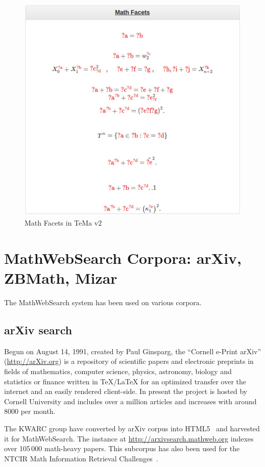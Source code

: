 \documentclass{deliverablereport}
\begin{document}
\begin{figure}[H]
\centering
 \includegraphics[scale=0.8]{figure10.jpg}
 \caption{Math Facets in TeMa v2}
 \label{fig:facets_temav2}
\end{figure}

\section{MathWebSearch Corpora: arXiv, ZBMath, Mizar}\label{arxiv}

The MathWebSearch system has been used on various corpora. 

\subsection{arXiv search}

Begun on August 14, 1991, created by Paul Ginsparg, the ``Cornell e-Print arXiv''
(\url{http://arXiv.org}) is a repository of scientific papers and electronic preprints in
fields of mathematics, computer science, physics, astronomy, biology and statistics or
finance written in {\TeX/\LaTeX} for an optimized transfer over the internet and an easily
rendered client-side. In present the project is hosted by Cornell University and includes
over a million articles and increases with around 8000 per month.

The KWARC group have converted by arXiv corpus into HTML5~\cite{StaKoh:tlcspx10} and
harvested it for MathWebSearch. The instance at \url{http://arxivsearch.mathweb.org}
indexes over 105\,000 math-heavy papers. This subcorpus has also been used for the NTCIR
Math Information Retrieval
Challenges~\cite{AizKohOun:nmpto13,AizKohOunSch:nmto14,AizKohOunSch:nmto16}.
\end{document}
